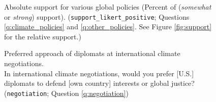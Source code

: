 \begin{figure}[h!] %
    \cprotect\caption[Absolute support for various global policies]{Absolute support for various global policies (Percent of (\textit{somewhat} or \textit{strong}) support). (\verb|support_likert_positive|; Questions \ref{q:climate_policies} and \ref{q:other_policies}. See Figure \ref{fig:support} for the relative support.)}\label{fig:support_likert_positive}
\end{figure}



\begin{figure}[h!]
    \cprotect\caption[Preferred approach for international climate negotiations]{Preferred approach of diplomats at international climate negotiations. \\ In international climate negotiations, would you prefer [U.S.] diplomats to defend [own country] interests or global justice? (\verb|negotiation|; Question \ref{q:negotiation})}\label{fig:negotiation}
\end{figure}

